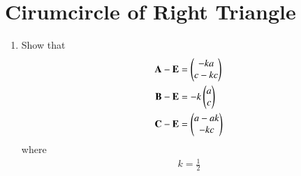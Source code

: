 \documentclass[journal,12pt,twocolumn]{IEEEtran}
\renewcommand\thesection{\arabic{section}}
\begin{document}
\section{Cirumcircle of Right Triangle}
\begin{enumerate}[label=\thesection.\arabic*
,ref=\thesection.\theenumi]
\item Show that
\begin{align}
\label{eq:rt_triang_circum_coord}
\mathbf{A}-\mathbf{E} &= \begin{pmatrix}-ka \\ c-kc\end{pmatrix} 
\\
\mathbf{B}-\mathbf{E} &=-k\begin{pmatrix}a \\ c\end{pmatrix}
\\
\mathbf{C}-\mathbf{E} &=\begin{pmatrix}a-ak \\ -kc\end{pmatrix}
\end{align}
%
where 
\begin{align}
k = \frac{1}{2}
\end{align}


\end{enumerate}
\end{document}
